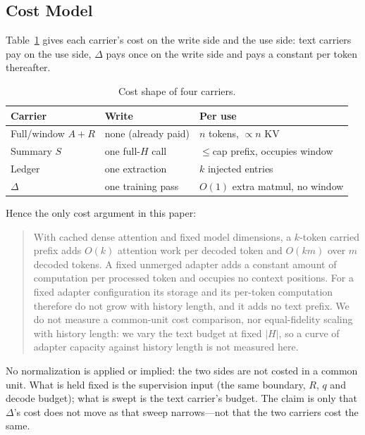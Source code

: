 \documentclass[sigconf,nonacm]{acmart}
\begin{document}
\subsection{Cost Model}\label{sec:costmodel}

Table~\ref{tab:cost} gives each carrier's cost on the write side and the use side: text carriers pay on the
use side, $\Delta$ pays once on the write side and pays a constant per token thereafter.
\begin{table}[t]
\centering
\small
\begin{tabularx}{\columnwidth}{@{}>{\raggedright\arraybackslash}p{1.5cm}>{\raggedright\arraybackslash}X>{\raggedright\arraybackslash}X@{}}
\toprule
Carrier & Write & Per use \\
\midrule
Full/window $A{+}R$ & none (already paid) & $n$ tokens, $\propto n$ KV \\
Summary $S$ & one full-$H$ call & $\le$cap prefix, occupies window \\
Ledger & one extraction & $k$ injected entries \\
$\Delta$ & one training pass & $O(1)$ extra matmul, no window \\
\bottomrule
\end{tabularx}
\caption{Cost shape of four carriers.}
\label{tab:cost}
\end{table}

Hence the only cost argument in this paper:
\begin{quote}
With cached dense attention and fixed model dimensions, a $k$-token carried prefix adds $O(k)$ attention work per
decoded token and $O(km)$ over $m$ decoded tokens. A fixed unmerged adapter adds a constant amount of computation
per processed token and occupies no context positions. For a fixed adapter configuration its storage and its
per-token computation therefore do not grow with history length, and it adds no text prefix. We do not measure a
common-unit cost comparison, nor equal-fidelity scaling with history length: we vary the text budget at fixed
$|H|$, so a curve of adapter capacity against history length is not measured here.
\end{quote}

No normalization is applied or implied: the two sides are not costed in a common unit. What is held fixed is the supervision input (the same boundary, $R$, $q$ and decode budget); what
is swept is the text carrier's budget. The claim is only that $\Delta$'s cost does not move as that sweep
narrows---not that the two carriers cost the same.
\end{document}
